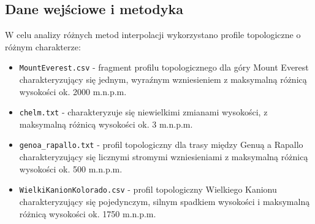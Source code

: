 \documentclass[a4paper,12pt]{article}
\begin{document}
	\subsection{Dane wejściowe i metodyka}
	W celu analizy różnych metod interpolacji wykorzystano profile topologiczne o różnym charakterze:
	\begin{itemize}
		\item \texttt{MountEverest.csv} - fragment profilu topologicznego dla góry Mount Everest charakteryzujący się jednym, wyraźnym wzniesieniem z maksymalną różnicą wysokości ok. 2000 m.n.p.m.
		\item \texttt{chelm.txt} - charakteryzuje się niewielkimi zmianami wysokości, z maksymalną różnicą wysokości ok. 3 m.n.p.m.
		\item \texttt{genoa\_rapallo.txt} - profil topologiczny dla trasy między Genuą a Rapallo charakteryzujący się licznymi stromymi wzniesieniami z maksymalną różnicą wysokości ok. 500 m.n.p.m.
		\item \texttt{WielkiKanionKolorado.csv} - profil topologiczny Wielkiego Kanionu charakteryzujący się pojedynczym, silnym spadkiem wysokości i maksymalną różnicą wysokości ok. 1750 m.n.p.m.
	\end{itemize}
  \begin{figure}[H]
    \centering
  \end{figure}
\end{document}

